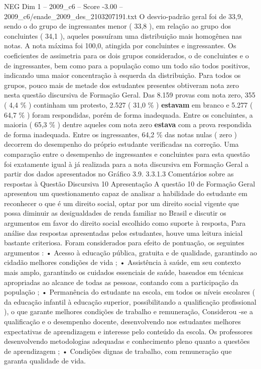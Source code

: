 \begin{textsample}{NEG Dim 1 – 2009\_c6 – Score -3.00 – 2009\_c6/enade\_2009\_des\_2103207191.txt}
O desvio-padrão geral foi de 33,9, sendo o do grupo de ingressantes menor ( 33,8 ), em relação ao grupo dos concluintes ( 34,1 ), aqueles possuíram uma distribuição mais homogênea nas notas.
A nota máxima foi 100,0, atingida por concluintes e ingressantes.
Os coeficientes de assimetria para os dois grupos considerados, o de concluintes e o de ingressantes, bem como para a população como um todo são todos positivos, indicando uma maior concentração à esquerda da distribuição.
Para todos os grupos, pouco mais de metade dos estudantes presentes obtiveram nota zero nesta questão discursiva de Formação Geral.
Das 8.159 provas com nota zero, 355 ( 4,4 \% ) continham um protesto, 2.527 ( 31,0 \% ) \textbf{estavam} em branco e 5.277 ( 64,7 \% ) foram respondidas, porém de forma inadequada.
Entre os concluintes, a maioria ( 65,3 \% ) dentre aqueles com nota zero \textbf{estava} com a prova respondida de forma inadequada.
Entre os ingressantes, 64,2 \% das notas nulas ( zero ) decorrem do desempenho do próprio estudante verificadas na correção.
Uma comparação entre o desempenho de ingressantes e concluintes para esta questão foi exatamente igual à já realizada para a nota discursiva em Formação Geral a partir dos dados apresentados no Gráfico 3.9. 3.3.1.3 Comentários sobre as respostas à Questão Discursiva 10 Apresentação A questão 10 de Formação Geral apresentou um questionamento capaz de analisar a habilidade do estudante em reconhecer o que é um direito social, optar por um direito social vigente que possa diminuir as desigualdades de renda familiar no Brasil e discutir os argumentos em favor do direito social escolhido como suporte à resposta, Para análise das respostas apresentadas pelos estudantes, houve uma leitura inicial bastante criteriosa.
Foram considerados para efeito de pontuação, os seguintes argumentos : • Acesso à educação pública, gratuita e de qualidade, garantindo ao cidadão melhores condições de vida ; • Assistência à saúde, em seu contexto mais amplo, garantindo os cuidados essenciais de saúde, baseados em técnicas apropriadas ao alcance de todas as pessoas, contando com a participação da população ; • Permanência do estudante na escola, em todos os níveis escolares ( da educação infantil à educação superior, possibilitando a qualificação profissional ), o que garante melhores condições de trabalho e remuneração, Considerou -se a qualificação e o desempenho docente, desenvolvendo nos estudantes melhores expectativas de aprendizagem e interesse pelo conteúdo da escola.
Os professores desenvolvendo metodologias adequadas e conhecimento pleno quanto a questões de aprendizagem ; • Condições dignas de trabalho, com remuneração que garanta qualidade de vida.

\end{textsample}

